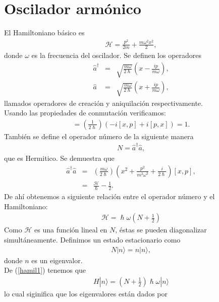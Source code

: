 \documentclass[letterpaper,12pt,oneside]{book}
\begin{document}
\section{Oscilador arm\'onico}
El Hamiltoniano básico es
%
\begin{eqnarray}
\mathcal{H} = \frac{p^2}{2m} + \frac{m\omega^2x^2}{2},
\end{eqnarray}
%
donde $\omega$ es la frecuencia del oscilador. Se definen los operadores 
%
\begin{eqnarray}
\hat a^\dagger &=& \sqrt{\frac{ m\omega}{2\hslash}}\left(x-\frac{ip}{m\omega}\right),\\
\hat a&=& \sqrt{\frac{ m\omega}{2\hslash}}\left(x+\frac{ip}{m\omega}\right),
\end{eqnarray}
%
llamados operadores de creaci\'on y aniquilaci\'on respectivamente.\\
Usando las propiedades de conmutaci\'on verificamos:\\
%
\begin{eqnarray}
[\hat a,\hat a^\dagger]=\left(\frac{1}{2\hslash}\right)(-i[x,p]+i[p,x])=1.
\end{eqnarray}
%
Tambi\'en se define el operador n\'umero de la siguiente manera
%
\begin{eqnarray}
N=\hat a^\dagger \hat a,
\end{eqnarray}
%
que es Hermitico. Se demuestra que 
%
\begin{eqnarray}
\hat a^\dagger \hat a &=& (\frac{m\omega}{2\hslash})(x^2+\frac{p^2}{m^2\omega^2}+\frac{i}{2\hslash})[x,p],\\
&=&\frac{\mathcal{H}}{\hslash}-\frac{1}{2}.
\end{eqnarray}
%
De ahí obtenemos a siguiente relaci\'on entre el operador n\'umero y el Hamiltoniano:
%
\begin{eqnarray}
\mathcal{H}=\hslash\omega (N+\frac{1}{2})\label{hamil1}
\end{eqnarray}
%
Como $\mathcal{H}$ es una funci\'on lineal en $N$, \'estas se pueden diagonalizar simult\'aneamente. Definimos un estado estacionario como
%
\begin{eqnarray}
N|n\rangle = n|n\rangle,
\end{eqnarray}
%
donde $n$ es un eigenvalor.\\
De (\ref{hamil1}) tenemos que 
%
\begin{eqnarray}
H|n\rangle = \left(N+\frac{1}{2}\right)\hslash \omega |n\rangle
\end{eqnarray}
%
lo cual siginifica que los eigenvalores est\'an dados por
\end{document}
